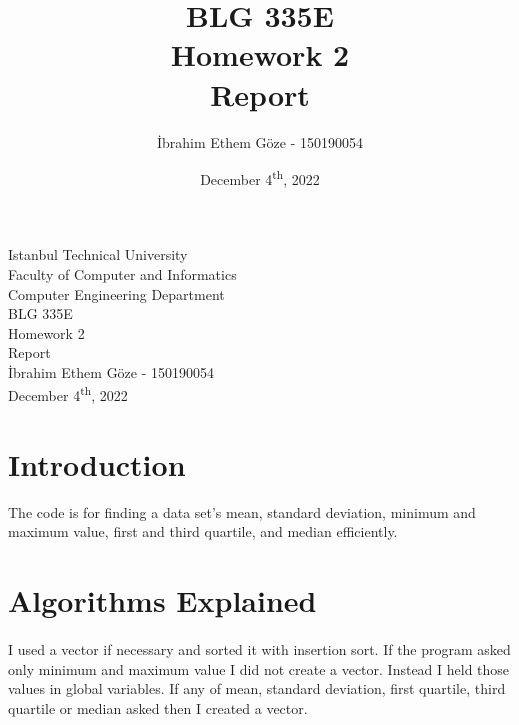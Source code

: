 \documentclass[a4paper, 12pt, titlepage]{article}
\title{BLG 335E \\ Homework 2 \\ Report}
\author{İbrahim Ethem Göze - 150190054}
\date{December 4\textsuperscript{th}, 2022}
\begin{document}


\begin{titlepage}
	\begin{center}
		\large{Istanbul Technical University \\ Faculty of Computer and Informatics \\ Computer Engineering Department} \\
		\vspace{150pt}
		\Large{BLG 335E \\ Homework 2 \\ Report}  \\
		\vspace{30pt}
		\large{İbrahim Ethem Göze - 150190054} \\
		\vspace{\fill} %
		\large{December 4\textsuperscript{th}, 2022}
	\end{center}
\end{titlepage}
\newpage
\tableofcontents
\newpage

\section{Introduction}
The code is for finding a data set's mean, standard deviation, minimum and maximum value, first and third quartile, and median efficiently.

\section{Algorithms Explained}
\paragraph{}
I used a vector if necessary and sorted it with insertion sort. If the program asked only minimum and maximum value I did not create a vector. Instead I held those values in global variables. If any of mean, standard deviation, first quartile, third quartile or median asked then I created a vector.
\end{document}
